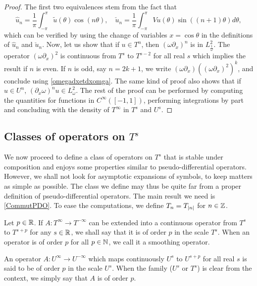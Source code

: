 \documentclass[a4paper]{article}
\begin{document}
\begin{proof}
	The first two equivalences stem from the fact that 
	\[\hat{u}_n = \frac{1}{\pi}\int_{-\pi}^{\pi} \tilde{u}(\theta) \cos(n \theta), \quad  \check{u}_n = \frac{1}{\pi} \int_{-\pi}^{\pi} Vu(\theta) \sin((n+1)\theta)d\theta,\]
	which can be verified by using the change of variables $x = \cos\theta$ in the definitions of $\hat{u}_n$ and $\check{u}_n$. 
	Now, let us show that if $ u \in T^n$, then $(\omega \partial_x)^n$ is in $L^2_\frac{1}{\omega}$. The operator $(\omega \partial_x)^2$ is continuous from $T^s$ to $T^{s-2}$ for all real $s$ which implies the result if $n$ is even. If $n$ is odd, say $n = 2k + 1$, we write $(\omega \partial_x)((\omega \partial_x)^{2})^k$, and conclude using \autoref{omegadxetdxomga}.
	The same kind of proof also shows that if $u \in U^n$, $(\partial_x \omega )^nu \in L^2_\omega$.
	The rest of the proof can be performed by computing the quantities for functions in $C^{\infty}([-1,1])$, performing integrations by part and concluding with the density of $T^{\infty}$ in $T^s$ and $U^s$. 
\end{proof}
\subsection{Classes of operators on $T^s$}
\label{subsec:classesOfOp}
We now proceed to define a class of operators on $T^s$ that is stable under composition and enjoys some properties similar to pseudo-differential operators. However, we shall not look for asymptotic expansions of symbols, to keep matters as simple as possible. The class we define may thus be quite far from a proper definition of pseudo-differential operators. The main result we need is \autoref{CommutPDO}. To ease the computations, we define $T_n = T_{\left\lvert n \right\rvert}$ for $n \in \mathbb{Z}$. 

\begin{Def}
	Let $p\in \mathbb{R}$. If  $A : T^{\infty} \to T^{-\infty}$ can be extended into a continuous operator from $T^{s}$ to $T^{s + p}$ for any $s \in \mathbb{R}$, we shall say that it is of order $p$ in the scale $T^s$. When an operator is of order $p$ for all $p \in \mathbb{N}$, we call it a smoothing operator. 
	
	An operator $A : U^{\infty} \to U^{-\infty}$ which maps continuously $U^s$ to $U^{s+p}$ for all real $s$ is said to be of order $p$ in the scale $U^s$. When the family ($U^s$ or $T^s$) is clear from the context, we simply say that $A$ is of order $p$. 
\end{Def}
\end{document}
